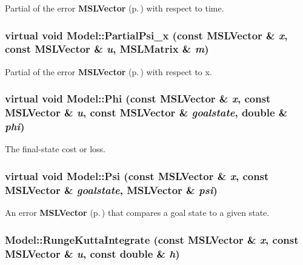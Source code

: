 Partial of the error {\bf MSLVector} {\rm (p.\,\pageref{classMSLVector})} with respect to time.

\subsubsection{\setlength{\rightskip}{0pt plus 5cm}virtual void Model::Partial\-Psi\_\-x (const {\bf MSLVector} \& {\em x}, const {\bf MSLVector} \& {\em u}, {\bf MSLMatrix} \& {\em m})\hspace{0.3cm}{\tt  [inline, virtual]}}\label{classModel_a19}


Partial of the error {\bf MSLVector} {\rm (p.\,\pageref{classMSLVector})} with respect to x.

\subsubsection{\setlength{\rightskip}{0pt plus 5cm}virtual void Model::Phi (const {\bf MSLVector} \& {\em x}, const {\bf MSLVector} \& {\em u}, const {\bf MSLVector} \& {\em goalstate}, double \& {\em phi})\hspace{0.3cm}{\tt  [inline, virtual]}}\label{classModel_a15}


The final-state cost or loss.

\subsubsection{\setlength{\rightskip}{0pt plus 5cm}virtual void Model::Psi (const {\bf MSLVector} \& {\em x}, const {\bf MSLVector} \& {\em goalstate}, {\bf MSLVector} \& {\em psi})\hspace{0.3cm}{\tt  [inline, virtual]}}\label{classModel_a18}


An error {\bf MSLVector} {\rm (p.\,\pageref{classMSLVector})} that compares a goal state to a given state.

\subsubsection{ Model::Runge\-Kutta\-Integrate (const {\bf MSLVector} \& {\em x}, const {\bf MSLVector} \& {\em u}, const double \& {\em h})\hspace{0.3cm}{\tt  [protected]}}\label{classModel_b0}


